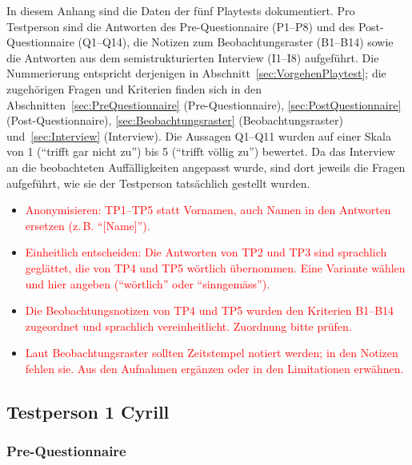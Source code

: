 \documentclass[../Main.tex]{subfiles}
\begin{document}
In diesem Anhang sind die Daten der fünf Playtests dokumentiert. Pro Testperson sind die Antworten des Pre-Questionnaire (P1--P8) und des Post-Questionnaire (Q1--Q14), die Notizen zum Beobachtungsraster (B1--B14) sowie die Antworten aus dem semistrukturierten Interview (I1--I8) aufgeführt. Die Nummerierung entspricht derjenigen in Abschnitt~\ref{sec:VorgehenPlaytest}; die zugehörigen Fragen und Kriterien finden sich in den Abschnitten~\ref{sec:PreQuestionnaire} (Pre-Questionnaire), \ref{sec:PostQuestionnaire} (Post-Questionnaire), \ref{sec:Beobachtungsraster} (Beobachtungsraster) und~\ref{sec:Interview} (Interview). Die Aussagen Q1--Q11 wurden auf einer Skala von 1 (\enquote{trifft gar nicht zu}) bis 5 (\enquote{trifft völlig zu}) bewertet. Da das Interview an die beobachteten Auffälligkeiten angepasst wurde, sind dort jeweils die Fragen aufgeführt, wie sie der Testperson tatsächlich gestellt wurden.

\begin{itemize}[leftmargin=1.5cm]
    \item \textcolor{red}{Anonymisieren: TP1--TP5 statt Vornamen, auch Namen in den Antworten ersetzen (z.\,B. \enquote{[Name]}).}
    \item \textcolor{red}{Einheitlich entscheiden: Die Antworten von TP2 und TP3 sind sprachlich geglättet, die von TP4 und TP5 wörtlich übernommen. Eine Variante wählen und hier angeben (\enquote{wörtlich} oder \enquote{sinngemäss}).}
    \item \textcolor{red}{Die Beobachtungsnotizen von TP4 und TP5 wurden den Kriterien B1--B14 zugeordnet und sprachlich vereinheitlicht. Zuordnung bitte prüfen.}
    \item \textcolor{red}{Laut Beobachtungsraster sollten Zeitstempel notiert werden; in den Notizen fehlen sie. Aus den Aufnahmen ergänzen oder in den Limitationen erwähnen.}
\end{itemize}

\subsection{Testperson 1 Cyrill}

\subsubsection{Pre-Questionnaire}
\end{document}
